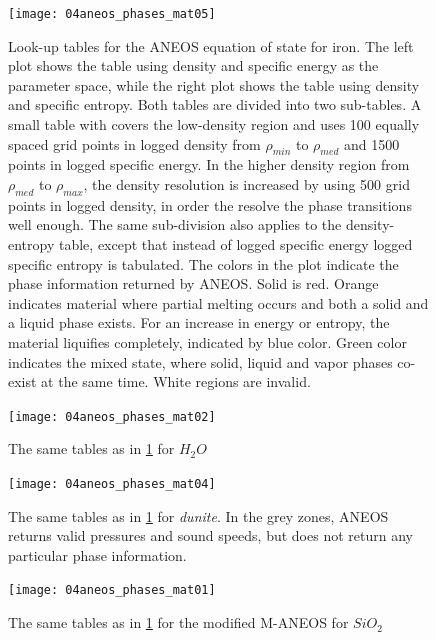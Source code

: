 \begin{figure}
\begin{center}
\texttt{[image: 04aneos\_phases\_mat05]}
\caption{Look-up tables for the ANEOS equation of state for iron. The left plot shows the table using density and specific energy as the parameter space, while the right plot shows the table using density and specific entropy. Both tables are divided into two sub-tables. A small table with covers the low-density region and uses 100 equally spaced grid points in logged density from $\rho_{min}$ to $\rho_{med}$ and 1500 points in logged specific energy. In the higher density region from $\rho_{med}$ to $\rho_{max}$, the density resolution is increased by using 500 grid points in logged density, in order the resolve the phase transitions well enough. The same sub-division also applies to the density-entropy table, except that instead of logged specific energy logged specific entropy is tabulated. The colors in the plot indicate the phase information returned by ANEOS. Solid is red. Orange indicates material where partial melting occurs and both a solid and a liquid phase exists. For an increase in energy or entropy, the material liquifies completely, indicated by blue color. Green color indicates the mixed state, where solid, liquid and vapor phases co-exist at the same time. White regions are invalid.}
\label{ch02_fig04a}
\end{center}
\end{figure}

\begin{figure}
\begin{center}
\texttt{[image: 04aneos\_phases\_mat02]}
\caption{The same tables as in \ref{ch02_fig04a} for $H_2 O$ }
\label{ch02_fig04b}
\end{center}
\end{figure}

\begin{figure}
\begin{center}
\texttt{[image: 04aneos\_phases\_mat04]}
\caption{The same tables as in \ref{ch02_fig04a} for \emph{dunite}. In the grey zones, ANEOS returns valid pressures and sound speeds, but does not return any particular phase information.}
\label{ch02_fig04c}
\end{center}
\end{figure}

\begin{figure}
\begin{center}
\texttt{[image: 04aneos\_phases\_mat01]}
\caption{The same tables as in \ref{ch02_fig04a} for the modified M-ANEOS for $SiO_2$}
\label{ch02_fig04d}
\end{center}
\end{figure}

